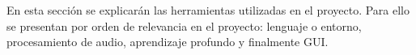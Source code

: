 En esta sección se explicarán las herramientas utilizadas en el proyecto. Para ello se presentan por orden de relevancia en el proyecto: lenguaje o entorno, procesamiento de audio, aprendizaje profundo y finalmente GUI. 